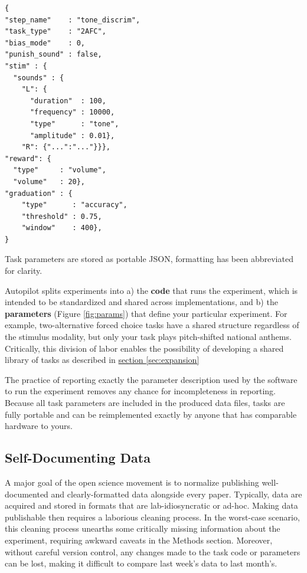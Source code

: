 \documentclass[nohyper, justified, notitlepage, marginals=raggedright,twoside=false,debug]{tufte-autopilot}
\begin{document}
%
\begin{marginfigure}[1.1cm]
\begin{verbatim}
{
"step_name"    : "tone_discrim",
"task_type"    : "2AFC",
"bias_mode"    : 0,
"punish_sound" : false,
"stim" : {
  "sounds" : {
    "L": {
      "duration"  : 100,
      "frequency" : 10000,
      "type"      : "tone",
      "amplitude" : 0.01},
    "R": {"...":"..."}}},
"reward": {
  "type"     : "volume",
  "volume"   : 20},
"graduation" : {
    "type"      : "accuracy",
    "threshold" : 0.75,
    "window"    : 400},
}
\end{verbatim}
\caption{Task parameters are stored as portable JSON, formatting has been abbreviated for clarity.}
\label{fig:params}
\end{marginfigure}%
%
%
Autopilot splits experiments into a) the \textbf{code} that runs the experiment, which is intended to be standardized and shared across implementations, and b) the \textbf{parameters} (Figure \ref{fig:params}) that define your particular experiment. For example, two-alternative forced choice tasks have a shared structure regardless of the stimulus modality, but only your task plays pitch-shifted national anthems. Critically, this division of labor enables the possibility of developing a shared library of tasks as described in \hyperref[sec:expansion]{section \ref{sec:expansion}}%

The practice of reporting exactly the parameter description used by the software to run the experiment removes any chance for incompleteness in reporting. Because all task parameters are included in the produced data files, tasks are fully portable and can be reimplemented exactly by anyone that has comparable hardware to yours. 

\subsection{Self-Documenting Data}
\label{sec:data}

A major goal of the open science movement is to normalize publishing well-documented and clearly-formatted data alongside every paper. Typically, data are acquired and stored in formats that are lab-idiosyncratic or ad-hoc. Making data publishable then requires a laborious cleaning process. In the worst-case scenario, this cleaning process unearths some critically missing information about the experiment, requiring awkward caveats in the Methods section. Moreover, without careful version control, any changes made to the task code or parameters can be lost, making it difficult to compare last week's data to last month's.
\end{document}
